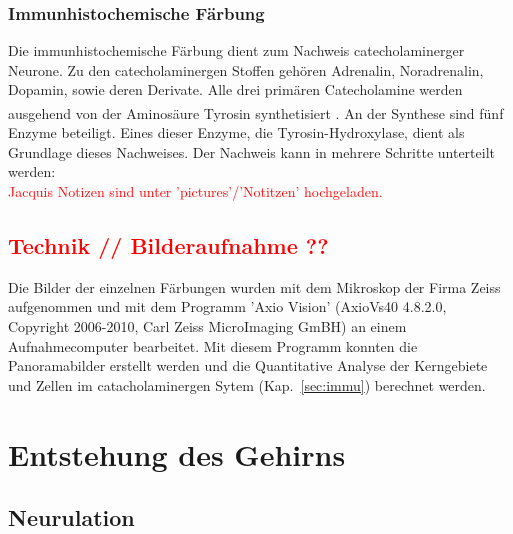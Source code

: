 \documentclass[12pt,a4paper,pdftex]{article}
\begin{document}
\subsubsection{Immunhistochemische Färbung}

Die immunhistochemische Färbung dient zum Nachweis catecholaminerger Neurone. Zu den catecholaminergen Stoffen gehören Adrenalin, Noradrenalin, Dopamin, sowie deren Derivate. Alle drei primären Catecholamine werden ausgehend von der Aminosäure Tyrosin synthetisiert \textsuperscript{\cite[13]{kandel2013principles}}. An der Synthese sind fünf Enzyme beteiligt. Eines dieser Enzyme, die Tyrosin-Hydroxylase, dient als Grundlage dieses Nachweises. Der Nachweis kann in mehrere Schritte unterteilt werden:\\

\textcolor{red}{Jacquis Notizen sind unter 'pictures'/'Notitzen' hochgeladen.}\\

\subsection{\textcolor{red}{Technik // Bilderaufnahme ??}}

Die Bilder der einzelnen Färbungen wurden mit dem Mikroskop der Firma Zeiss aufgenommen und mit dem Programm 'Axio Vision' (AxioVs40 4.8.2.0, Copyright 2006-2010, Carl Zeiss MicroImaging GmBH) an einem Aufnahmecomputer bearbeitet. Mit diesem Programm konnten die Panoramabilder erstellt werden und die Quantitative Analyse der Kerngebiete und Zellen im catacholaminergen Sytem (Kap.~\ref{sec:immu}) berechnet werden.





\newpage
\section{Entstehung des Gehirns}

\subsection{Neurulation}
\label{subsec:Neurulation} 
\end{document}
